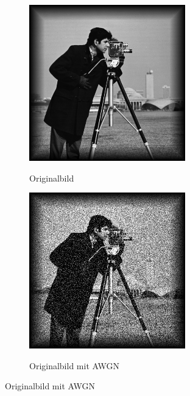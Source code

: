 \begin{figure}[!ht]
  \centering
  \begin{subfigure}[b]{.4\linewidth}
    \caption{Originalbild}
    \includegraphics[width=\linewidth]{pictures/introBeta/cameraman.png}
    \label{fig:camerman}
  \end{subfigure}
  \quad
  \begin{subfigure}[b]{.4\linewidth}
    \caption{Originalbild mit AWGN}
    \includegraphics[width=\linewidth]{pictures/introBeta/snr10.png}
    \label{fig:camermanSNR10}
  \end{subfigure}


\end{figure}

